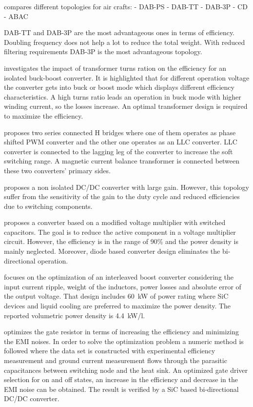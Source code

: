 \documentclass[energies,article,submit,moreauthors,pdftex]{Definitions/mdpi}
\begin{document}
\cite{Ojeda-Rodriguez2020} compares different topologies for air crafts:
- DAB-PS
- DAB-TT
- DAB-3P
- CD
- ABAC

DAB-TT and DAB-3P are the most advantageous ones in terms of efficiency. Doubling frequency does not help a lot to reduce the total weight. With reduced filtering requirements DAB-3P is the most advantageous topology.

\cite{MashinchiMaheri2020} investigates the impact of transformer turns ration on the efficiency for an isolated buck-boost converter. It is highlighted that for different operation voltage the converter gets into buck or boost mode which displays different efficiency characteristics. A high turns ratio leads an operation in buck mode with higher winding current, so the losses increase. An optimal transformer design is required to maximize the efficiency.

\cite{Lin2017} proposes two series connected H bridges where one of them operates as phase shifted PWM converter and the other one operates as an LLC converter. LLC converter is connected to the lagging leg of the converter to increase the soft switching range. A magnetic current balance transformer is connected between these two converters' primary sides.

\cite{Chen2020} proposes a non isolated DC/DC converter with large gain. However, this topology suffer from the sensitivity of the gain to the duty cycle and reduced efficiencies due to switching components.

\cite{Stala2020} proposes a converter based on a modified voltage multiplier with switched capacitors. The goal is to reduce the active component in a voltage multiplier circuit. However, the efficiency is in the range of 90\% and the power density is mainly neglected. Moreover, diode based converter design eliminates the bi-directional operation.

\cite{Tran2020} focuses on the optimization of an interleaved boost converter considering the input current ripple, weight of the inductors, power losses and absolute error of the output voltage. That design includes 60~kW of power rating where SiC devices and liquid cooling are preferred to maximize the power density. The reported volumetric power density is 4.4~kW/l.

\cite{Moradpour2020} optimizes the gate resistor in terms of increasing the efficiency and minimizing the EMI noises. In order to solve the optimization problem a numeric method is followed where the data set is constructed with experimental efficiency measurement and ground current measurement flows through the parasitic capacitances between switching node and the heat sink. An optimized gate driver selection for on and off states, an increase in the efficiency and decrease in the EMI noise can be obtained. The result is verified by a SiC based bi-directional DC/DC converter.
\end{document}
